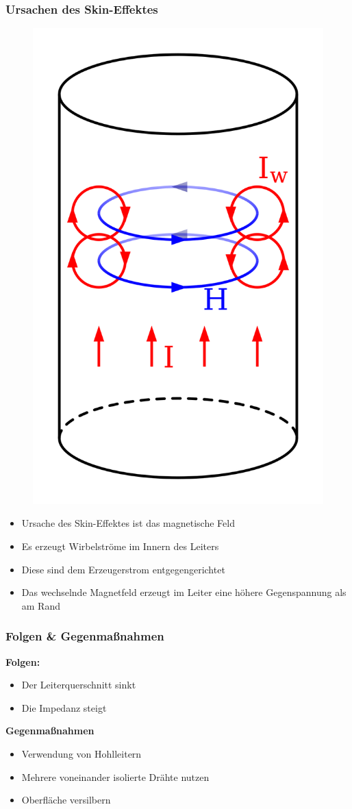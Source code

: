 \begin{frame}
  \frametitle{Ursachen des Skin-Effektes}
  \begin{center}
    \begin{figure}
      \includegraphics[width=.4\textwidth,height=.35\textheight,keepaspectratio]{a02/Skineffect.png}
    \end{figure}
    \begin{itemize}
      \item Ursache des Skin-Effektes ist das magnetische Feld
      \item Es erzeugt Wirbelströme im Innern des Leiters
      \item Diese sind dem Erzeugerstrom entgegengerichtet
      \item Das wechselnde Magnetfeld erzeugt im Leiter eine höhere Gegenspannung als am Rand
    \end{itemize}
  \end{center}
\end{frame}

\begin{frame}
  \frametitle{Folgen \& Gegenmaßnahmen}
  \textbf{Folgen:}
  \begin{itemize}
    \item Der Leiterquerschnitt sinkt
    \item Die Impedanz steigt
  \end{itemize}
  \textbf{Gegenmaßnahmen}
  \begin{itemize}
    \item Verwendung von Hohlleitern
    \item Mehrere voneinander isolierte Drähte nutzen
    \item Oberfläche versilbern
  \end{itemize}
\end{frame}

